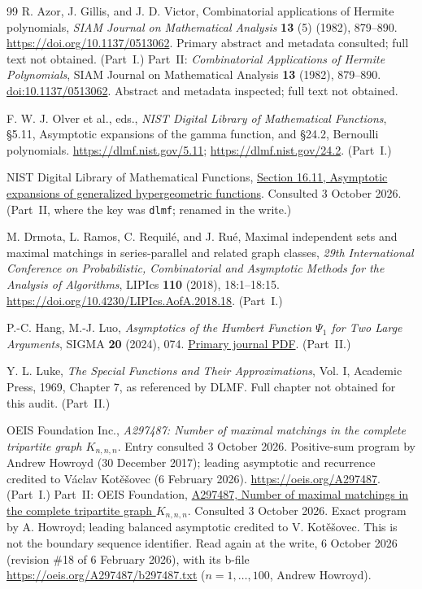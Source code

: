 \documentclass[11pt,letterpaper]{article}
\theoremstyle{remark}\newtheorem{remark}[theorem]{Remark}
\begin{document}
\begin{thebibliography}{99}
R. Azor, J. Gillis, and J. D. Victor, Combinatorial applications of Hermite polynomials,
\emph{SIAM Journal on Mathematical Analysis} \textbf{13} (5) (1982), 879--890.
\url{https://doi.org/10.1137/0513062}.
Primary abstract and metadata consulted; full text not obtained. (Part~I.)
Part~II: \emph{Combinatorial Applications of Hermite Polynomials}, SIAM Journal on Mathematical Analysis \textbf{13} (1982), 879--890. \href{https://doi.org/10.1137/0513062}{doi:10.1137/0513062}. Abstract and metadata inspected; full text not obtained.

F. W. J. Olver et al., eds., \emph{NIST Digital Library of Mathematical Functions}, \S5.11, Asymptotic expansions of the gamma function, and \S24.2, Bernoulli polynomials.
\url{https://dlmf.nist.gov/5.11}; \url{https://dlmf.nist.gov/24.2}. (Part~I.)

 NIST Digital Library of Mathematical Functions, \href{https://dlmf.nist.gov/16.11}{Section 16.11, Asymptotic expansions of generalized hypergeometric functions}. Consulted 3 October 2026. (Part~II, where the key was \texttt{dlmf}; renamed in the write.)

M. Drmota, L. Ramos, C. Requil\'e, and J. Ru\'e, Maximal independent sets and maximal matchings in series-parallel and related graph classes,
\emph{29th International Conference on Probabilistic, Combinatorial and Asymptotic Methods for the Analysis of Algorithms}, LIPIcs \textbf{110} (2018), 18:1--18:15.
\url{https://doi.org/10.4230/LIPIcs.AofA.2018.18}. (Part~I.)

 P.-C. Hang, M.-J. Luo, \emph{Asymptotics of the Humbert Function $\Psi_1$ for Two Large Arguments}, SIGMA \textbf{20} (2024), 074. \href{https://sigma-journal.com/2024/074/sigma24-074.pdf}{Primary journal PDF}. (Part~II.)

 Y. L. Luke, \emph{The Special Functions and Their Approximations}, Vol. I, Academic Press, 1969, Chapter 7, as referenced by DLMF. Full chapter not obtained for this audit. (Part~II.)

OEIS Foundation Inc., \emph{A297487: Number of maximal matchings in the complete tripartite graph $K_{n,n,n}$}.
Entry consulted 3 October 2026. Positive-sum program by Andrew Howroyd (30 December 2017); leading asymptotic and recurrence credited to V\'aclav Kot\v e\v sovec (6 February 2026).
\url{https://oeis.org/A297487}. (Part~I.)
Part~II: OEIS Foundation, \href{https://oeis.org/A297487}{A297487, Number of maximal matchings in the complete tripartite graph $K_{n,n,n}$}. Consulted 3 October 2026. Exact program by A. Howroyd; leading balanced asymptotic credited to V. Kot\v e\v sovec. This is not the boundary sequence identifier.
Read again at the write, 6 October 2026 (revision \#18 of 6 February 2026), with its b-file \url{https://oeis.org/A297487/b297487.txt} ($n=1,\dots,100$, Andrew Howroyd).


\end{thebibliography}
\end{document}
